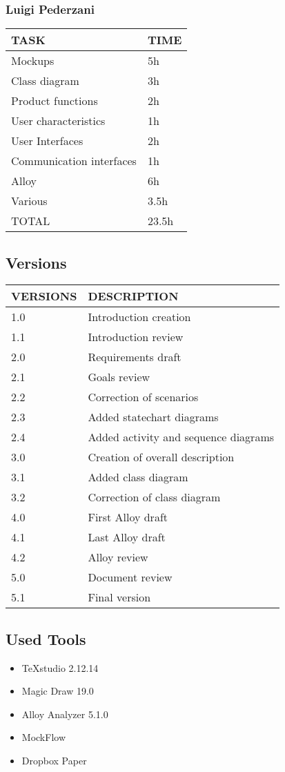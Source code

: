 \subsubsection{Luigi Pederzani}
\hfill
\begin{center}
	\begin{tabular}{ | l | p{6cm} | } 
		\hline
		TASK & TIME \\ 
		\hline
		Mockups & 5h  \\ 
		\hline
		Class diagram & 3h  \\ 
		\hline
		Product functions & 2h \\ 
		\hline
		User characteristics & 1h \\ 
		\hline
		User Interfaces & 2h \\ 
		\hline
		Communication interfaces & 1h \\ 
		\hline
		Alloy & 6h   \\ 
		\hline
		Various & 3.5h  \\ 
		\hline
		TOTAL & 23.5h \\ 
		\hline
	\end{tabular}
\end{center}

\newpage
\subsection{Versions}
\hfill
\hfill
\begin{center}
	\begin{tabular}{ | l | p{6cm} | } 
		\hline
			VERSIONS & DESCRIPTION  \\ 
		\hline
		1.0 & Introduction creation   \\ 
		\hline
		1.1 & Introduction review  \\ 
		\hline
		2.0 & Requirements draft \\ 
		\hline
		2.1 & Goals review \\ 
		\hline
		2.2 & Correction of scenarios \\ 
		\hline
		2.3 & Added statechart diagrams   \\ 
		\hline
		2.4 & Added activity and sequence diagrams  \\ 
		\hline
		3.0 & Creation of overall description \\ 
		\hline
		3.1 & Added class diagram \\ 
		\hline
		3.2 & Correction of class diagram \\ 
		\hline
		4.0 & First Alloy draft  \\ 
		\hline
		4.1 & Last Alloy draft \\ 
		\hline
		4.2 & Alloy review \\ 
		\hline
		5.0 & Document review \\ 
		\hline
		5.1 & Final version \\ 
		\hline
	\end{tabular}
\end{center}

\subsection{Used Tools}

\begin{itemize}
	\item TeXstudio 2.12.14
	\item Magic Draw 19.0
	\item Alloy Analyzer 5.1.0
	\item MockFlow
	\item Dropbox Paper
\end{itemize}